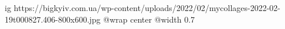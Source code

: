  
 
 
 
 

\ifcmt
  ig https://bigkyiv.com.ua/wp-content/uploads/2022/02/mycollages-2022-02-19t000827.406-800x600.jpg
	@wrap center
	@width 0.7
\fi
